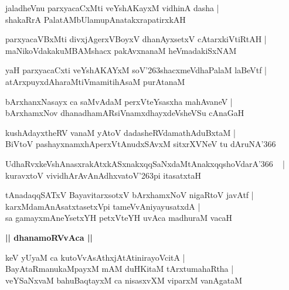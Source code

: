 \documentclass[twoside,12pt,openright]{book}
\def\S{\char'263}
\newcounter{shloka}[chapter]
\def\uvaca#1{\centerline{{\large\textbf{#1}}}}
\begin{document}
\begin{shloka}%
jaladheVnu parxyacaCxMti veYshAKayxM vidhinA dasha |\\
shakaRrA PalatAMbUlamupAnatakxrapatirxkAH 
\end{shloka}

\begin{shloka}%
parxyacaVBxMti divxjAgerxVBoyxV dhanAyxsetxV cAtarxkiVtiRtAH |\\
maNikoVdakakuMBAMshacx pakAvxnanaM heVmadakiSxNAM  
\end{shloka}

\begin{shloka}%
yaH parxyacaCxti veYshAKAYxM soV\S shacxmeVdhaPalaM laBeVtf |\\
atArxpuyxdAharaMtiVmamitihAsaM purAtanaM
\end{shloka}

\begin{shloka}%
bArxhanxNasayx ca saMvAdaM perxVteYsasxha mahAvaneV |\\
bArxhamxNov dhanadhamARsiVnamxdhayxdeVsheVSu cAnaGaH 
\end{shloka}

\begin{shloka}%
kushAdayxtheRV vanaM yAtoV dadasheRVdamathAduBxtaM |\\
BiVtoV pashayxnamxhAperxVtAnudxSAvxM sitxrXVNeV tu dAruNA\char'366
\end{shloka}

\begin{shloka}%
UdhaRvxkeVshAnasxrakAtxkASxnakxqqSaNxdaMtAnakxqqshoVdarA\char'366 ~ |\\
kuravxtoV vividhArAvAnAdhxvatoV\S pi itasatxtaH 
\end{shloka}

\begin{shloka}%
tAnadaqqSATxV BayavitarxsotxV bArxhamxNoV nigaRtoV javAtf |\\
karxMdamAnAsatxtasetxVpi tameVvAniyayusatxdA |\\
sa gamayxmAneYsetxYH petxVteYH uvAca madhuraM vacaH 
\end{shloka}

\uvaca{|| dhanamoRVvAca ||}

\begin{shloka}%
keV yUyaM ca kutoVvAsAthxjAtAtinirayoVcitA |\\
BayAtaRmanukaMpayxM mAM duHKitaM tArxtumahaRtha |\\
veYSaNxvaM bahuBaqtayxM ca nisasxvXM viparxM vanAgataM 
\end{shloka}
\end{document}

